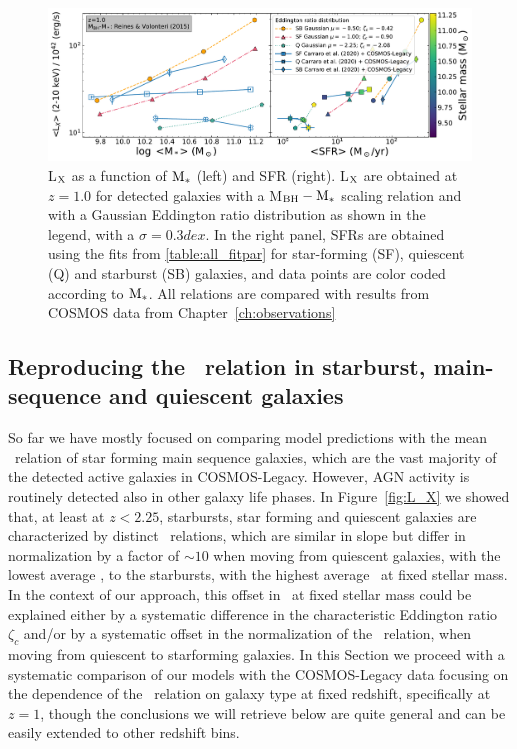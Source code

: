 \begin{figure}
\begin{center}
\includegraphics[width=\textwidth]{Figs/Chapter3/fig4_1.0_active.pdf} 
  \caption{L$_{\rm X}$ as a function of ${\rm M}_*$ (left) and SFR (right). L$_{\rm X}$ are
  obtained at %
  $z=1.0$ for detected galaxies with a \citet{2015ApJ...813...82R} M$_{\rm BH}-{\rm M}_*$
  scaling relation and with a Gaussian Eddington ratio distribution as shown in the legend,
  with a $\sigma=0.3 dex$. In the right panel, SFRs are obtained using the fits from
  \ref{table:all_fitpar} for star-forming (SF), quiescent (Q) and starburst (SB) galaxies,
  and data points are color coded according to ${\rm M}_*$. All relations are compared with
  results from COSMOS data from Chapter~\ref{ch:observations}}
    \label{fig:SFQSB_active}
\end{center}
\end{figure}

\subsection{Reproducing the \LXMS\ relation in starburst, main-sequence and quiescent galaxies} \label{subsec:SFQSB}

So far we have mostly focused on comparing model predictions with the mean \LXMS\ relation
of star forming main sequence galaxies, which are the vast majority of the detected  active galaxies in COSMOS-Legacy. However, AGN activity is routinely detected also in other galaxy life phases. In Figure~\ref{fig:L_X} we showed that, at least at $z<2.25$, starbursts, star forming and quiescent galaxies are characterized by distinct \LXMS\ relations, which are similar in slope but differ in normalization by a factor of $\sim 10$ when moving from quiescent galaxies, with the lowest average \LX, to the starbursts, with the highest average \LX\ at fixed stellar mass. In the context of our approach, this offset in \LX\ at fixed stellar mass could be explained either by a systematic difference in the characteristic Eddington ratio $\zeta_c$ and/or by a systematic offset in the normalization of the \MBHMS\ relation, when moving from quiescent to starforming galaxies. In this Section we proceed with a systematic comparison of our models with the COSMOS-Legacy data focusing on the dependence of the \LXMS\ relation on galaxy type at fixed redshift, specifically at $z=1$, though the conclusions we will retrieve below are quite general and can be easily extended to other redshift bins.
 
